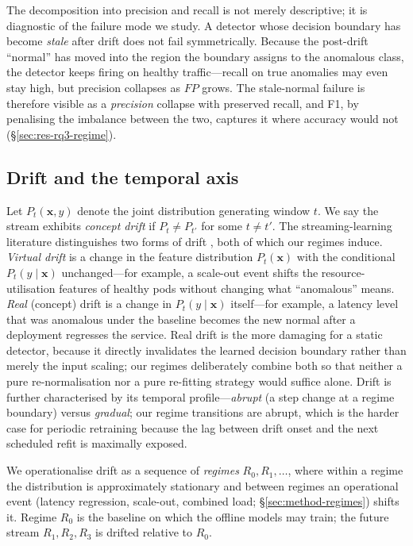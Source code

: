 \documentclass[pdflatex,sn-mathphys-num]{sn-jnl}%
\theoremstyle{thmstyleone}%
\theoremstyle{thmstyletwo}%
\theoremstyle{thmstylethree}%
\begin{document}
The decomposition into precision and recall is not merely descriptive; it is diagnostic of the failure mode we study. A detector whose decision boundary has become \emph{stale} after drift does not fail symmetrically. Because the post-drift ``normal'' has moved into the region the boundary assigns to the anomalous class, the detector keeps firing on healthy traffic---recall on true anomalies may even stay high, but precision collapses as $FP$ grows. The stale-normal failure is therefore visible as a \emph{precision} collapse with preserved recall, and F1, by penalising the imbalance between the two, captures it where accuracy would not (\S\ref{sec:res-rq3-regime}).

\subsection{Drift and the temporal axis}\label{sec:prob-drift}

Let $P_t(\mathbf{x}, y)$ denote the joint distribution generating window $t$. We say the stream exhibits \emph{concept drift} if $P_t \neq P_{t'}$ for some $t \neq t'$. The streaming-learning literature distinguishes two forms of drift \cite{arora2024drift}, both of which our regimes induce. \emph{Virtual drift} is a change in the feature distribution $P_t(\mathbf{x})$ with the conditional $P_t(y\mid\mathbf{x})$ unchanged---for example, a scale-out event shifts the resource-utilisation features of healthy pods without changing what ``anomalous'' means. \emph{Real} (concept) drift is a change in $P_t(y\mid\mathbf{x})$ itself---for example, a latency level that was anomalous under the baseline becomes the new normal after a deployment regresses the service. Real drift is the more damaging for a static detector, because it directly invalidates the learned decision boundary rather than merely the input scaling; our regimes deliberately combine both so that neither a pure re-normalisation nor a pure re-fitting strategy would suffice alone. Drift is further characterised by its temporal profile---\emph{abrupt} (a step change at a regime boundary) versus \emph{gradual}; our regime transitions are abrupt, which is the harder case for periodic retraining because the lag between drift onset and the next scheduled refit is maximally exposed.

We operationalise drift as a sequence of \emph{regimes} $R_0, R_1, \dots$, where within a regime the distribution is approximately stationary and between regimes an operational event (latency regression, scale-out, combined load; \S\ref{sec:method-regimes}) shifts it. Regime $R_0$ is the baseline on which the offline models may train; the future stream $R_1, R_2, R_3$ is drifted relative to $R_0$.
\end{document}

